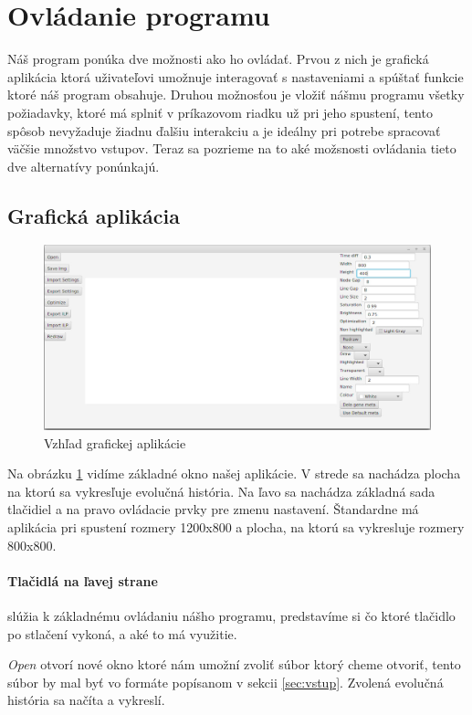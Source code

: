\section{Ovládanie programu}
Náš program ponúka dve možnosti ako ho ovládať. Prvou z nich je grafická aplikácia ktorá uživateľovi umožnuje interagovať s nastaveniami a 
spúštať funkcie ktoré náš program obsahuje.
Druhou možnosťou je vložiť nášmu programu všetky požiadavky, ktoré má splniť v príkazovom riadku už pri jeho spustení,
tento spôsob nevyžaduje žiadnu ďalšiu interakciu a je ideálny pri potrebe spracovať väčšie množstvo vstupov.
Teraz sa pozrieme na to aké možsnosti ovládania tieto dve alternatívy ponúnkajú.
\subsection{Grafická aplikácia}
\begin{figure}[t]
 \centering
\includegraphics[width=1\textwidth]{images/gui}
\caption{Vzhľad grafickej aplikácie}\label{obr:gui}
\end{figure}

Na obrázku \ref{obr:gui} vidíme základné okno našej aplikácie. V strede sa nachádza plocha na ktorú sa vykresľuje evolučná história. Na ľavo sa nachádza základná sada tlačidiel a na pravo ovládacie prvky pre zmenu nastavení.
Štandardne má aplikácia pri spustení rozmery 1200x800 a plocha, na ktorú sa vykresluje rozmery 800x800.
\paragraph{Tlačidlá na ľavej strane} slúžia k základnému ovládaniu nášho programu, predstavíme si čo ktoré tlačidlo po stlačení vykoná, a aké to má využitie.

\emph{Open} otvorí nové okno ktoré nám umožní zvoliť súbor ktorý cheme otvoriť, tento súbor by mal byť vo formáte popísanom v sekcii \ref{sec:vstup}. 
 Zvolená evolučná história sa načíta a vykreslí.
 
